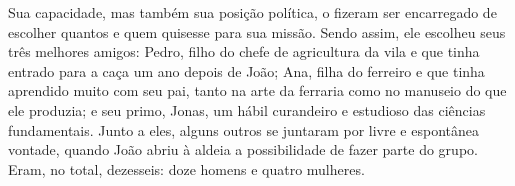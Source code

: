 Sua capacidade, mas também sua posição política, o fizeram ser encarregado de escolher quantos e quem quisesse para sua missão. Sendo assim, ele escolheu seus três melhores amigos: Pedro, filho do chefe de agricultura da vila e que tinha entrado para a caça um ano depois de João; Ana, filha do ferreiro e que tinha aprendido muito com seu pai, tanto na arte da ferraria como no manuseio do que ele produzia; e seu primo, Jonas, um hábil curandeiro e estudioso das ciências fundamentais. Junto a eles, alguns outros se juntaram por livre e espontânea vontade, quando João abriu à aldeia a possibilidade de fazer parte do grupo. Eram, no total, dezesseis: doze homens e quatro mulheres.

